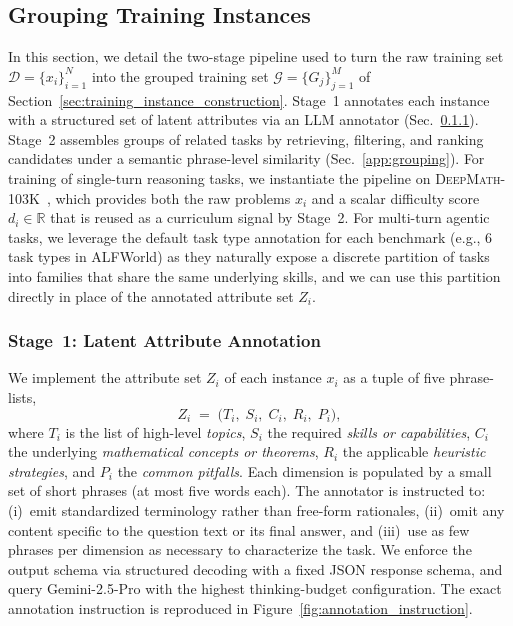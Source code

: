 \subsection{Grouping Training Instances}\label{app:group_training}
In this section, we detail the two-stage pipeline used to turn the raw training set $\mathcal{D}=\{x_i\}_{i=1}^N$ into the grouped training set $\mathcal{G}=\{G_j\}_{j=1}^M$ of Section~\ref{sec:training_instance_construction}. Stage~1 annotates each instance with a structured set of latent attributes via an LLM annotator (Sec.~\ref{app:annotation}). Stage~2 assembles groups of related tasks by retrieving, filtering, and ranking candidates under a semantic phrase-level similarity (Sec.~\ref{app:grouping}). For training of single-turn reasoning tasks, we instantiate the pipeline on \textsc{DeepMath-103K}~\citep{he2026deepmathk}, which provides both the raw problems $x_i$ and a scalar difficulty score $d_i\in\mathbb{R}$ that is reused as a curriculum signal by Stage~2. For multi-turn agentic tasks, we leverage the default task type annotation for each benchmark (e.g., 6 task types in ALFWorld) as they naturally expose a discrete partition of tasks into families that share the same underlying skills, and we can use this partition directly in place of the annotated attribute set $Z_i$.
 
\subsubsection{Stage~1: Latent Attribute Annotation}\label{app:annotation}
We implement the attribute set $Z_i$ of each instance $x_i$ as a tuple of five phrase-lists,
\[
Z_i \;=\; \bigl(T_i,\; S_i,\; C_i,\; R_i,\; P_i\bigr),
\]
where $T_i$ is the list of high-level \emph{topics}, $S_i$ the required \emph{skills or capabilities}, $C_i$ the underlying \emph{mathematical concepts or theorems}, $R_i$ the applicable \emph{heuristic strategies}, and $P_i$ the \emph{common pitfalls}. Each dimension is populated by a small set of short phrases (at most five words each). The annotator is instructed to: (i)~emit standardized terminology rather than free-form rationales, (ii)~omit any content specific to the question text or its final answer, and (iii)~use as few phrases per dimension as necessary to characterize the task. We enforce the output schema via structured decoding with a fixed JSON response schema, and query Gemini-2.5-Pro with the highest thinking-budget configuration. The exact annotation instruction is reproduced in Figure~\ref{fig:annotation_instruction}.
 
